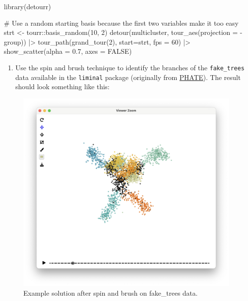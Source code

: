 \documentclass[
  letterpaper,
]{book}
\newenvironment{Shaded}{\begin{snugshade}}{\end{snugshade}}
\newcommand{\AttributeTok}[1]{\textcolor[rgb]{0.40,0.45,0.13}{#1}}
\newcommand{\CommentTok}[1]{\textcolor[rgb]{0.37,0.37,0.37}{#1}}
\newcommand{\ConstantTok}[1]{\textcolor[rgb]{0.56,0.35,0.01}{#1}}
\newcommand{\DecValTok}[1]{\textcolor[rgb]{0.68,0.00,0.00}{#1}}
\newcommand{\FloatTok}[1]{\textcolor[rgb]{0.68,0.00,0.00}{#1}}
\newcommand{\FunctionTok}[1]{\textcolor[rgb]{0.28,0.35,0.67}{#1}}
\newcommand{\NormalTok}[1]{\textcolor[rgb]{0.00,0.23,0.31}{#1}}
\newcommand{\OtherTok}[1]{\textcolor[rgb]{0.00,0.23,0.31}{#1}}
\newcommand{\SpecialCharTok}[1]{\textcolor[rgb]{0.37,0.37,0.37}{#1}}
\providecommand{\tightlist}{%
  \setlength{\itemsep}{0pt}\setlength{\parskip}{0pt}}\usepackage{longtable,booktabs,array}
\begin{document}
\begin{Shaded}
\begin{Highlighting}[]
\FunctionTok{library}\NormalTok{(detourr)}

\CommentTok{\# Use a random starting basis because the first two variables make it too easy}
\NormalTok{strt }\OtherTok{\textless{}{-}}\NormalTok{ tourr}\SpecialCharTok{::}\FunctionTok{basis\_random}\NormalTok{(}\DecValTok{10}\NormalTok{, }\DecValTok{2}\NormalTok{)}
\FunctionTok{detour}\NormalTok{(multicluster, }
       \FunctionTok{tour\_aes}\NormalTok{(}\AttributeTok{projection =} \SpecialCharTok{{-}}\NormalTok{group)) }\SpecialCharTok{|\textgreater{}}
       \FunctionTok{tour\_path}\NormalTok{(}\FunctionTok{grand\_tour}\NormalTok{(}\DecValTok{2}\NormalTok{), }\AttributeTok{start=}\NormalTok{strt, }\AttributeTok{fps =} \DecValTok{60}\NormalTok{) }\SpecialCharTok{|\textgreater{}}
       \FunctionTok{show\_scatter}\NormalTok{(}\AttributeTok{alpha =} \FloatTok{0.7}\NormalTok{, }\AttributeTok{axes =} \ConstantTok{FALSE}\NormalTok{)}
\end{Highlighting}
\end{Shaded}

\begin{enumerate}
\def\labelenumi{\arabic{enumi}.}
\setcounter{enumi}{2}
\tightlist
\item
  Use the spin and brush technique to identify the branches of the
  \texttt{fake\_trees} data available in the \texttt{liminal} package
  (originally from
  \href{https://phate.readthedocs.io/en/stable/}{PHATE}). The result
  should look something like this:
\end{enumerate}

\begin{figure}

{\centering \includegraphics{./images/fake_trees_sb.png}

}

\caption{\label{fig-fake-trees-sb}Example solution after spin and brush
on fake\_trees data.}

\end{figure}
\end{document}
